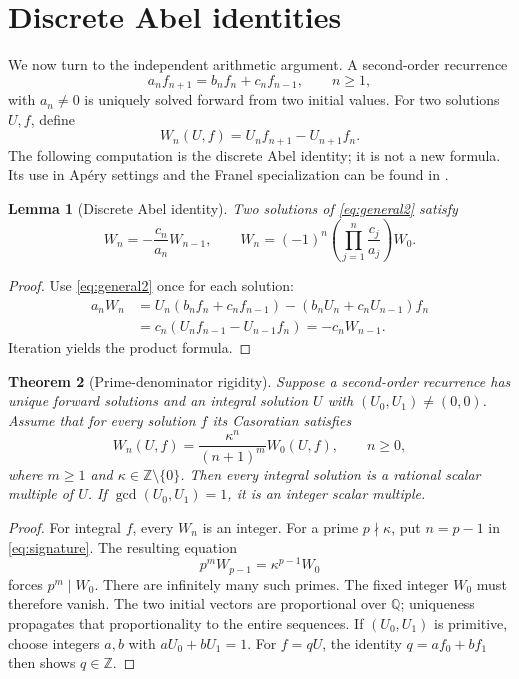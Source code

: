\documentclass[11pt,a4paper]{article}
\newtheorem{theorem}{Theorem}[section]
\newtheorem{lemma}[theorem]{Lemma}
\theoremstyle{definition}\newtheorem{definition}[theorem]{Definition}
\theoremstyle{remark}\newtheorem{remark}[theorem]{Remark}
\newcommand{\Q}{\mathbb Q}\newcommand{\Z}{\mathbb Z}\newcommand{\N}{\mathbb N}\newcommand{\R}{\mathbb R}\newcommand{\C}{\mathbb C}
\begin{document}
\section{Discrete Abel identities}\label{sec:abel}
We now turn to the independent arithmetic argument. A second-order recurrence
\begin{equation}\label{eq:general2}
 a_n f_{n+1}=b_n f_n+c_n f_{n-1},\qquad n\ge1,
\end{equation}
with $a_n\ne0$ is uniquely solved forward from two initial values. For two
solutions $U,f$, define
\[
 W_n(U,f)=U_nf_{n+1}-U_{n+1}f_n.
\]
The following computation is the discrete Abel identity; it is not a new
formula. Its use in Ap\'ery settings and the Franel specialization can be found
in \cite{CS,Tonien}.

\begin{lemma}[Discrete Abel identity]\label{lem:abel}
Two solutions of \eqref{eq:general2} satisfy
\[
 W_n=-\frac{c_n}{a_n}W_{n-1},\qquad
 W_n=(-1)^n\left(\prod_{j=1}^{n}\frac{c_j}{a_j}\right)W_0.
\]
\end{lemma}
\begin{proof}
Use \eqref{eq:general2} once for each solution:
\begin{align*}
 a_nW_n
 &=U_n(b_nf_n+c_nf_{n-1})-(b_nU_n+c_nU_{n-1})f_n\\
 &=c_n(U_nf_{n-1}-U_{n-1}f_n)=-c_nW_{n-1}.
\end{align*}
Iteration yields the product formula.
\end{proof}

\begin{theorem}[Prime-denominator rigidity]\label{thm:generalrigid}
Suppose a second-order recurrence has unique forward solutions and an integral
solution $U$ with $(U_0,U_1)\ne(0,0)$. Assume that for every solution $f$ its
Casoratian satisfies
\begin{equation}\label{eq:signature}
 W_n(U,f)=\frac{\kappa^n}{(n+1)^m}W_0(U,f),\qquad n\ge0,
\end{equation}
where $m\ge1$ and $\kappa\in\Z\setminus\{0\}$. Then every integral solution
is a rational scalar multiple of $U$. If $\gcd(U_0,U_1)=1$, it is an integer
scalar multiple.
\end{theorem}
\begin{proof}
For integral $f$, every $W_n$ is an integer. For a prime $p\nmid\kappa$, put
$n=p-1$ in \eqref{eq:signature}. The resulting equation
\[
 p^mW_{p-1}=\kappa^{p-1}W_0
\]
forces $p^m\mid W_0$. There are infinitely many such primes. The fixed integer
$W_0$ must therefore vanish. The two initial vectors are proportional over
$\Q$; uniqueness propagates that proportionality to the entire sequences.
If $(U_0,U_1)$ is primitive, choose integers $a,b$ with $aU_0+bU_1=1$.
For $f=qU$, the identity $q=af_0+bf_1$ then shows $q\in\Z$.
\end{proof}
\end{document}
